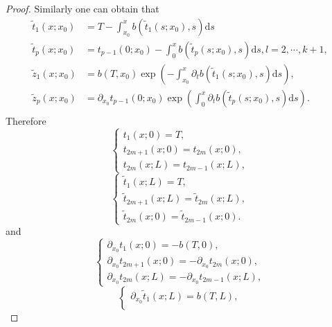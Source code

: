 \documentclass[a4paper,reqno,11pt]{amsart}
\numberwithin{equation}{section} %
\begin{document}
\begin{proof}
Similarly one can obtain that
$$
\begin{aligned}
	\tilde{t}  _1 \left( x;x_0 \right) &=T-\int_{x_0}^x b\left( \tilde{t}  _1 \left( s;x_0 \right) ,s \right) \text{d}s\\
    \tilde{t} _p \left( x;x_0 \right) &=t _{p-1} \left( 0;x_0 \right)-\int_{0}^x b\left( \tilde{t} _p \left( s;x_0 \right) ,s \right) \text{d}s , l=2 , \cdots , k+1 ,\\
	\tilde{z} _1 \left( x;x_0 \right) &=b\left( T,x_0 \right) \exp \left(  -\int_{x_0}^x{\partial _t}b\left(\tilde{ t} _1 \left( s;x_0 \right) ,s \right) \text{d}s \right), \\
	\tilde{z} _p \left( x;x_0 \right) &=\partial _{x_0} t _{p-1} \left( 0;x_0 \right) \exp \left(  \int_{0}^x{\partial _t}b\left( \tilde{t} _p \left( s;x_0 \right) ,s \right) \text{d}s \right).\\
\end{aligned}
$$
Therefore
\begin{equation}\label{29}
    \left\{ \begin{array}{l}
		t_{1}(x;0) =T,\\
        t_{2m+1}(x;0) = t_{2m}(x;0) ,\\
        t_{2m}(x;L) = t_{2m - 1}(x;L) ,
    \end{array} \right. 
    \end{equation}
\begin{equation}\label{210}
    \left\{ \begin{array}{l}
		\tilde{t} _{1}(x;L) =T,\\
        \tilde{t} _{2m+1}(x;L) = \tilde{t} _{2m}(x;L) ,\\
        \tilde{t} _{2m}(x;0) = \tilde{t} _{2m - 1}(x;0) .
    \end{array} \right. 
    \end{equation}
and
\begin{equation}\label{211}
    \left\{ \begin{array}{l}
		\partial _{x_0} t_{1}(x;0) = -b(T,0),\\
        \partial _{x_0} t_{2m+1}(x;0) = -\partial _{x_0} t_{2m}(x;0) ,\\
        \partial _{x_0} t_{2m}(x;L) = -\partial _{x_0} t_{2m - 1}(x;L) ,
    \end{array} \right. 
    \end{equation}
\begin{equation}\label{212}
    \left\{ \begin{array}{l}
		\partial _{x_0} \tilde{t} _{1}(x;L) = b(T,L),\\

\end{array}
\end{equation}
\end{proof}
\end{document}
